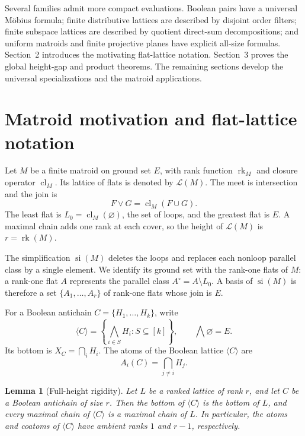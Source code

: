 \documentclass[11pt]{article}
\newtheorem{lemma}[theorem]{Lemma}
\theoremstyle{definition}
\theoremstyle{remark}
\newcommand{\cl}{\operatorname{cl}}
\newcommand{\rk}{\operatorname{rk}}
\newcommand{\si}{\operatorname{si}}
\newcommand{\cL}{\mathcal L}
\begin{document}
Several families admit more compact evaluations.  Boolean pairs have a
universal M\"obius formula; finite distributive lattices are described by
disjoint order filters; finite subspace lattices are described by quotient
direct-sum decompositions; and uniform matroids and finite projective planes
have explicit all-size formulas.  Section~2 introduces the motivating
flat-lattice notation.  Section~3 proves the global height-gap and product
theorems.  The remaining sections develop the universal specializations and
the matroid applications.

\section{Matroid motivation and flat-lattice notation}

Let $M$ be a finite matroid on ground set $E$, with rank function $\rk_M$ and
closure operator $\cl_M$.  Its lattice of flats is denoted by $\cL(M)$.  The
meet is intersection and the join is
\[
 F\vee G=\cl_M(F\cup G).
\]
The least flat is $L_0=\cl_M(\varnothing)$, the set of loops, and the greatest
flat is $E$.  A maximal chain adds one rank at each cover, so the height of
$\cL(M)$ is $r=\rk(M)$.

The simplification $\si(M)$ deletes the loops and replaces each nonloop
parallel class by a single element.  We identify its ground set with the
rank-one flats of $M$: a rank-one flat $A$ represents the parallel class
$A^\circ=A\setminus L_0$.  A basis of $\si(M)$ is therefore a set
$\{A_1,\ldots,A_r\}$ of rank-one flats whose join is $E$.

For a Boolean antichain $C=\{H_1,\ldots,H_k\}$, write
\[
 \langle C\rangle=\left\{\bigwedge_{i\in S}H_i:S\subseteq[k]\right\},
 \qquad \bigwedge\varnothing=E.
\]
Its bottom is $X_C=\bigcap_i H_i$.  The atoms of the Boolean lattice
$\langle C\rangle$ are
\begin{equation}\label{eq:boolean-atoms}
 A_i(C)=\bigcap_{j\ne i}H_j.
\end{equation}

\begin{lemma}[Full-height rigidity]\label{lem:full-height}
Let $L$ be a ranked lattice of rank $r$, and let $C$ be a Boolean antichain
of size $r$.  Then the bottom of $\langle C\rangle$ is the bottom of $L$,
and every maximal chain of $\langle C\rangle$ is a maximal chain of $L$.
In particular, the atoms and coatoms of $\langle C\rangle$ have ambient
ranks $1$ and $r-1$, respectively.
\end{lemma}
\end{document}
